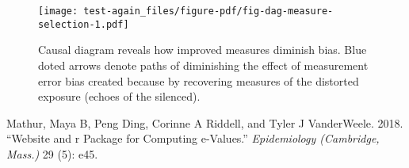 \documentclass[
  singlecolumn]{article}
\newlength{\cslhangindent}
\newlength{\cslentryspacingunit} %
\newenvironment{CSLReferences}[2] %
 {%
  \setlength{\parindent}{0pt}
  \ifodd #1
  \let\oldpar\par
  \def\par{\hangindent=\cslhangindent\oldpar}
  \fi
  \setlength{\parskip}{#2\cslentryspacingunit}
 }%
 {}
\begin{document}
\begin{figure}

{\centering \texttt{[image: test-again\_files/figure-pdf/fig-dag-measure-selection-1.pdf]}

}

\caption{\label{fig-dag-measure-selection}Causal diagram reveals how
improved measures diminish bias. Blue doted arrows denote paths of
diminishing the effect of measurement error bias created because by
recovering measures of the distorted exposure (echoes of the silenced).}

\end{figure}

\hypertarget{refs}{}
\begin{CSLReferences}{1}{0}
\leavevmode{}%
Mathur, Maya B, Peng Ding, Corinne A Riddell, and Tyler J VanderWeele.
2018. {``Website and r Package for Computing e-Values.''}
\emph{Epidemiology (Cambridge, Mass.)} 29 (5): e45.

\end{CSLReferences}
\end{document}
